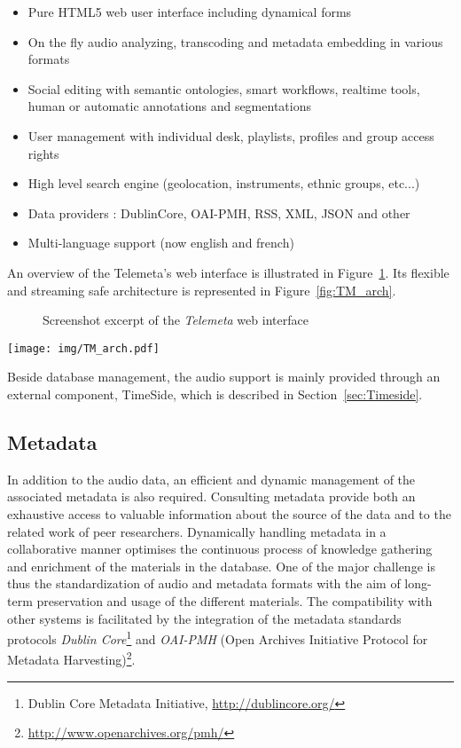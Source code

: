 \documentclass{paper}
\begin{document}
      \begin{itemize}
      \item Pure HTML5 web user interface including dynamical forms
      \item On the fly audio analyzing, transcoding and metadata
        embedding in various formats
      \item Social editing with semantic ontologies, smart workflows,
        realtime tools, human or automatic annotations and
        segmentations
      \item User management with individual desk, playlists, profiles
        and group access rights
      \item High level search engine (geolocation, instruments, ethnic groups, etc...)
      \item Data providers : DublinCore, OAI-PMH, RSS, XML, JSON and other 
      \item Multi-language support (now english and french)
      \end{itemize}

An overview of the Telemeta's web interface is illustrated in Figure~\ref{fig:Telemeta}. Its flexible and streaming safe   architecture is represented in Figure~\ref{fig:TM_arch}.

\begin{figure}
   \centering
   \caption[1]{Screenshot excerpt of the \emph{Telemeta} web interface}
    \label{fig:Telemeta}
 \end{figure}

\begin{figure*}[htbp]
  \centering
  \texttt{[image: img/TM\_arch.pdf]}
  \caption{Telemeta architecture}\label{fig:TM_arch}
\end{figure*}

      
Beside database management, the audio support is mainly provided through an external component, TimeSide, which is described in Section~\ref{sec:Timeside}.

\subsection{Metadata}\label{sec:metadata}
In addition to the audio data, an efficient and dynamic management of the associated metadata is also required. Consulting metadata provide both an exhaustive access to valuable information about the source of the data and to the related work of peer researchers. 
Dynamically handling metadata in a collaborative manner optimises the continuous process of knowledge gathering and enrichment of the materials in the database.  
One of the major challenge is thus the standardization of audio and metadata formats with the aim of long-term preservation and usage of the different materials.
The compatibility with other systems is facilitated by the integration of the metadata standards protocols \emph{Dublin Core}\footnote{{Dublin Core} Metadata Initiative, \url{http://dublincore.org/}} and \emph{OAI-PMH} (Open Archives Initiative Protocol for Metadata Harvesting)\footnote{\url{http://www.openarchives.org/pmh/}}.
\end{document}
